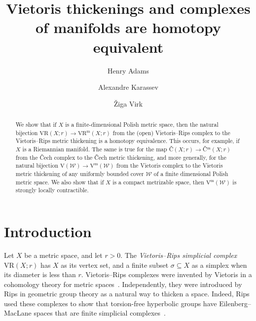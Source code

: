 \documentclass[11pt, reqno, english]{amsart}
\theoremstyle{plain}
\theoremstyle{definition}
\theoremstyle{myremark}
\newcommand{\cW}{\mathcal{W}}
\newcommand{\note}[1]{\textcolor{blue}{({#1})}}
\newcommand{\vr}[2]{\mathrm{VR}(#1;#2)}
\newcommand{\viet}[1]{\mathrm{V}(#1)}
\newcommand{\vietm}[1]{\mathrm{V}^\mathrm{m}(#1)}
\newcommand{\vrm}[2]{\mathrm{VR}^\mathrm{m}(#1;#2)}
\newcommand{\cech}[2]{\mathrm{\check{C}}(#1;#2)}
\newcommand{\cechm}[2]{\mathrm{\check{C}}^\mathrm{m}(#1;#2)}
\begin{document}
\title{Vietoris thickenings and complexes of manifolds are homotopy equivalent}

\author{Henry Adams}
\author{Alexandre Karassev}
\author{\v{Z}iga Virk}

\begin{abstract}
We show that if $X$ is a finite-dimensional Polish metric space, then the natural bijection $\vr{X}{r}\to\vrm{X}{r}$ from the (open) Vietoris--Rips complex to the Vietoris--Rips metric thickening is a homotopy equivalence.
This occurs, for example, if $X$ is a Riemannian manifold.
The same is true for the map \v{C}$(X;r)\to$\v{C}$^\mathrm{m}(X;r)$
from the \v{C}ech complex to the \v{C}ech metric thickening, and more generally, for the natural bijection $\viet{\cW}\to\vietm{\cW}$ from the Vietoris complex to the Vietoris metric thickening of any uniformly bounded cover $\cW$ of a finite dimensional Polish metric space.
We also show that if $X$ is a compact metrizable space, then $\vietm{\cW}$ is strongly locally contractible.
\end{abstract}



\maketitle




\section{Introduction}

Let $X$ be a metric space, and let $r>0$.
The \emph{Vietoris--Rips simplicial complex $\vr{X}{r}$} has $X$ as its vertex set, and a finite subset $\sigma\subseteq X$ as a simplex when its diameter is less than $r$.
Vietoris--Rips complexes were invented by %
Vietoris in a cohomology theory for metric spaces~\cite{Vietoris27,lefschetz1942algebraic}.
Independently, they were introduced by %
Rips in geometric group theory as a natural way to thicken a space.
Indeed, Rips used these complexes to show that torsion-free hyperbolic groups have Eilenberg--MacLane spaces that are finite simplicial complexes~\cite{bridson2011metric}.
\end{document}
